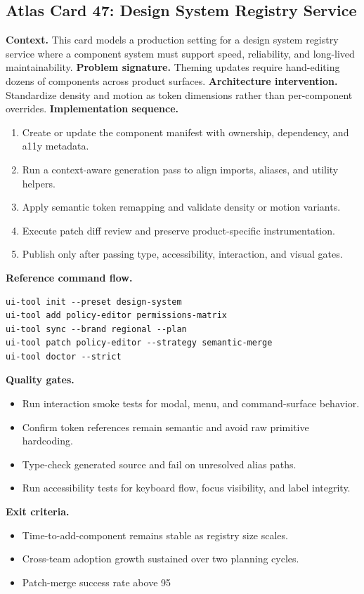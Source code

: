 \subsection*{Atlas Card 47: Design System Registry Service}
\textbf{Context.} This card models a production setting for a design system registry service where a component system must support speed, reliability, and long-lived maintainability.
\textbf{Problem signature.} Theming updates require hand-editing dozens of components across product surfaces.
\textbf{Architecture intervention.} Standardize density and motion as token dimensions rather than per-component overrides.
\textbf{Implementation sequence.}
\begin{enumerate}[leftmargin=*, itemsep=0.28em]
  \item Create or update the component manifest with ownership, dependency, and a11y metadata.
  \item Run a context-aware generation pass to align imports, aliases, and utility helpers.
  \item Apply semantic token remapping and validate density or motion variants.
  \item Execute patch diff review and preserve product-specific instrumentation.
  \item Publish only after passing type, accessibility, interaction, and visual gates.
\end{enumerate}
\textbf{Reference command flow.}
\begin{verbatim}
ui-tool init --preset design-system
ui-tool add policy-editor permissions-matrix
ui-tool sync --brand regional --plan
ui-tool patch policy-editor --strategy semantic-merge
ui-tool doctor --strict
\end{verbatim}
\textbf{Quality gates.}
\begin{itemize}[leftmargin=*, itemsep=0.24em]
  \item Run interaction smoke tests for modal, menu, and command-surface behavior.
  \item Confirm token references remain semantic and avoid raw primitive hardcoding.
  \item Type-check generated source and fail on unresolved alias paths.
  \item Run accessibility tests for keyboard flow, focus visibility, and label integrity.
\end{itemize}
\textbf{Exit criteria.}
\begin{itemize}[leftmargin=*, itemsep=0.24em]
  \item Time-to-add-component remains stable as registry size scales.
  \item Cross-team adoption growth sustained over two planning cycles.
  \item Patch-merge success rate above 95%
\end{itemize}
\clearpage
